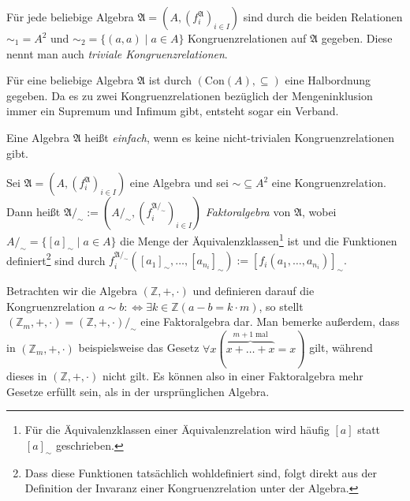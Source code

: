 \begin{example}
    Für jede beliebige Algebra $\mathfrak{A}=(A,(f^\mathfrak{A}_i)_{i\in I})$ sind durch die beiden Relationen $\sim_1=A^2$ und $\sim_2=\{(a,a)\mid a\in A\}$
    Kongruenzrelationen auf $\mathfrak{A}$ gegeben. Diese nennt man auch \emph{triviale Kongruenzrelationen}.
\end{example}

\begin{remark}
    Für eine beliebige Algebra $\mathfrak{A}$ ist durch $(\text{Con}(A),\subseteq)$ eine Halbordnung gegeben.
    Da es zu zwei Kongruenzrelationen bezüglich der Mengeninklusion immer ein Supremum und Infimum gibt,
    entsteht sogar ein Verband.
\end{remark}

\begin{definition} \label{def:einfache-algebra}
    Eine Algebra $\mathfrak{A}$ heißt \emph{einfach}, wenn es keine nicht-trivialen Kongruenzrelationen gibt.
\end{definition}

\begin{definition}
    Sei $\mathfrak{A}=(A,(f^\mathfrak{A}_i)_{i\in I})$ eine Algebra und sei $\sim\subseteq A^2$ eine Kongruenzrelation. Dann heißt $\mathfrak{A}/_\sim:=(A/_\sim,(f^{\mathfrak{A}/_\sim}_i)_{i\in I})$ \emph{Faktoralgebra} von $\mathfrak{A}$,
    wobei $A/_\sim=\{[a]_\sim\mid a\in A\}$ die Menge der Äquivalenzklassen\footnote{Für die Äquivalenzklassen einer Äquivalenzrelation
    wird häufig $[a]$ statt $[a]_\sim$ geschrieben.} ist und die Funktionen definiert\footnote{Dass diese Funktionen tatsächlich wohldefiniert sind,
    folgt direkt aus der Definition der Invaranz einer Kongruenzrelation unter der Algebra.} sind durch
    $f_i^{\mathfrak{A}/_\sim}([a_1]_\sim,\ldots,[a_{n_i}]_\sim):=[f_i(a_1,\ldots,a_{n_i})]_\sim.$
\end{definition}

\begin{example}
    Betrachten wir die Algebra $(\mathbb{Z},+,\cdot)$ und definieren darauf die Kongruenzrelation
    $a\sim b:\Leftrightarrow \exists k\in\mathbb{Z}(a-b=k\cdot m)$, so stellt $(\mathbb{Z}_m,+,\cdot)=(\mathbb{Z},+,\cdot)/_\sim$
    eine Faktoralgebra dar. Man bemerke außerdem, dass in $(\mathbb{Z}_m,+,\cdot)$ beispielsweise das Gesetz
    $\forall x(\overbrace{x +\ldots + x}^{m+1\;\text{mal}}=x)$ gilt, während dieses in $(\mathbb{Z},+,\cdot)$ nicht gilt. Es können also in einer Faktoralgebra mehr Gesetze erfüllt sein, als in der ursprünglichen Algebra.
\end{example}

